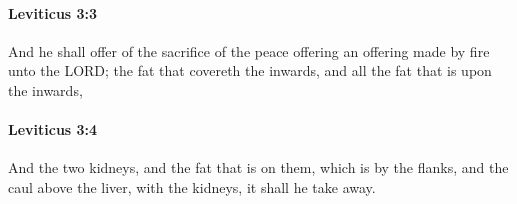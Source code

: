 		\paragraph{Leviticus 3:3} %
			\label{LEVITICUS-3-3}

			And he shall offer of the sacrifice of the peace offering an offering made by fire unto the LORD; the fat that covereth the inwards, and all the fat that is upon the inwards,


		\paragraph{Leviticus 3:4} %
			\label{LEVITICUS-3-4}

			And the two kidneys, and the fat that is on them, which is by the flanks, and the caul above the liver, with the kidneys, it shall he take away.


